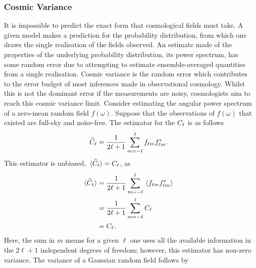 \subsubsection{Cosmic Variance}

It is impossible to predict the exact form that cosmological fields must take.
A given model makes a prediction for the probability distribution, from which one draws the single realisation of the fields observed.
An estimate made of the properties of the underlying probability distribution, \ie{} its power spectrum, has some random error due to attempting to estimate ensemble-averaged quantities from a single realisation.
Cosmic variance is the random error which contributes to the error budget of most inferences made in observational cosmology.
Whilst this is not the dominant error if the measurements are noisy, cosmologists aim to reach this cosmic variance limit.
Consider estimating the angular power spectrum of a zero-mean random field \(f(\omega)\).
Suppose that the observations of \(f(\omega)\) that existed are full-sky and noise-free.
The estimator for the \(C_{\ell}{}\) is as follows
%
\begin{equation}
	\widehat{C}_{\ell}
	= \frac{1}{2\ell+1} \sum\limits_{m=-\ell}^{\ell} {f}_{\ell m} {f}_{\ell m}^{\ast}.
\end{equation}
%
This estimator is unbiased, \ie{} \(\expval*{\widehat{C}_{\ell}} = C_{\ell}{}\), as
%
\begin{align}
	\expval*{\widehat{C}_{\ell}}
	 & = \frac{1}{2\ell+1} \sum\limits_{m=-\ell}^{\ell} \expval*{{f}_{\ell m} {f}_{\ell m}^{\ast}} \nonumber{} \\
	 & = \frac{1}{2\ell+1} \sum\limits_{m=-\ell}^{\ell} C_{\ell} \nonumber{}                             \\
	 & = C_{\ell}.
\end{align}
%
Here, the sum in \(m\) means for a given \(\ell{}\) one uses all the available information in the \(2\ell+1\) independent degrees of freedom; however, this estimator has non-zero variance.
The variance of a Gaussian random field follows by
%
